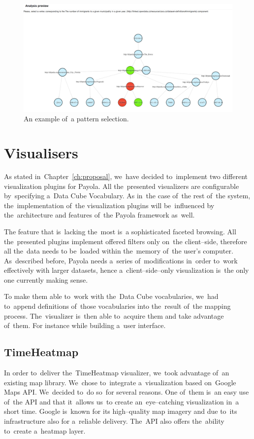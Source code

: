 \begin{figure}
	\centering
	\includegraphics[width=140mm]{img/pattern-selection.png}
	\caption{An example of~a pattern selection.}
	\label{fig:pattern-selection}
\end{figure}

\section{Visualisers}
As stated in~Chapter~\ref{ch:proposal}, we~have decided to~implement two 
different visualization plugins for Payola. All the~presented 
visualizers are configurable by~specifying a~Data Cube Vocabulary.
As in~the case of~the rest of~the 
system, the~implementation of~the visualization plugins will be~influenced 
by the~architecture and features of~the Payola framework as~well.

The feature that is~lacking the~most  is~a sophisticated faceted browsing. All the~presented plugins 
implement offered filters only on~the client--side, therefore all the~data needs 
to be~loaded within the~memory of~the user’s computer. As~described before, Payola 
needs a~series of~modifications in~order to~work effectively with larger 
datasets, hence a~client--side--only visualization is~the only one currently making sense.

To make them able to~work with the~Data Cube vocabularies, we~had to~append 
definitions of~those vocabularies into the~result of~the mapping process. The~visualizer is~then able to~acquire them and take advantage of~them. For instance 
while building a~user interface.

\subsection{TimeHeatmap}
In order to~deliver the~TimeHeatmap visualizer, we~took advantage of~an existing 
map library. We~chose to~integrate a~visualization based on~Google Maps API. We~decided to~do so~for several reasons. One of~them is~an easy use of~the API and that it~allows us~to
create an~eye--catching visualization in~a short 
time. Google is~known for its high--quality map imagery and due to~its 
infrastructure also for a~reliable delivery. The~API also offers the~ability to~create a~heatmap layer.

